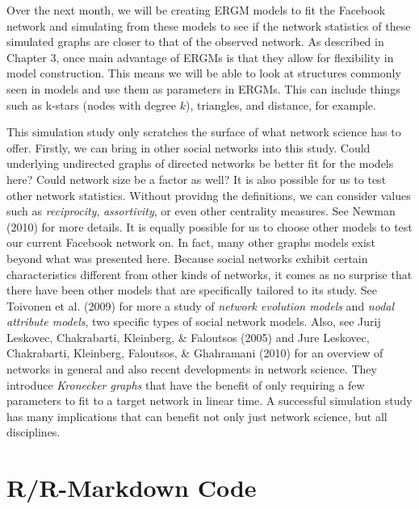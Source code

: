 \documentclass[12pt,twoside]{amherstthesis}
\begin{document}
  Over the next month, we will be creating ERGM models to fit the Facebook
  network and simulating from these models to see if the network
  statistics of these simulated graphs are closer to that of the observed
  network. As described in Chapter 3, once main advantage of ERGMs is that
  they allow for flexibility in model construction. This means we will be
  able to look at structures commonly seen in models and use them as
  parameters in ERGMs. This can include things such as k-stars (nodes with
  degree \(k\)), triangles, and distance, for example.
  
  This simulation study only scratches the surface of what network science
  has to offer. Firstly, we can bring in other social networks into this
  study. Could underlying undirected graphs of directed networks be better
  fit for the models here? Could network size be a factor as well? It is
  also possible for us to test other network statistics. Without providng
  the definitions, we can consider values such as \emph{reciprocity},
  \emph{assortivity}, or even other centrality measures. See Newman (2010)
  for more details. It is equally possible for us to choose other models
  to test our current Facebook network on. In fact, many other graphs
  models exist beyond what was presented here. Because social networks
  exhibit certain characteristics different from other kinds of networks,
  it comes as no surprise that there have been other models that are
  specifically tailored to its study. See Toivonen et al. (2009) for more
  a study of \emph{network evolution models} and \emph{nodal attribute
  models}, two specific types of social network models. Also, see Jurij
  Leskovec, Chakrabarti, Kleinberg, \& Faloutsos (2005) and Jure Leskovec,
  Chakrabarti, Kleinberg, Faloutsos, \& Ghahramani (2010) for an overview
  of networks in general and also recent developments in network science.
  They introduce \emph{Kronecker graphs} that have the benefit of only
  requiring a few parameters to fit to a target network in linear time. A
  successful simulation study has many implications that can benefit not
  only just network science, but all disciplines.
  
  \singlespacing
  
  \appendix
  
  \chapter{R/R-Markdown Code}\label{rr-markdown-code}
  
\end{document}
